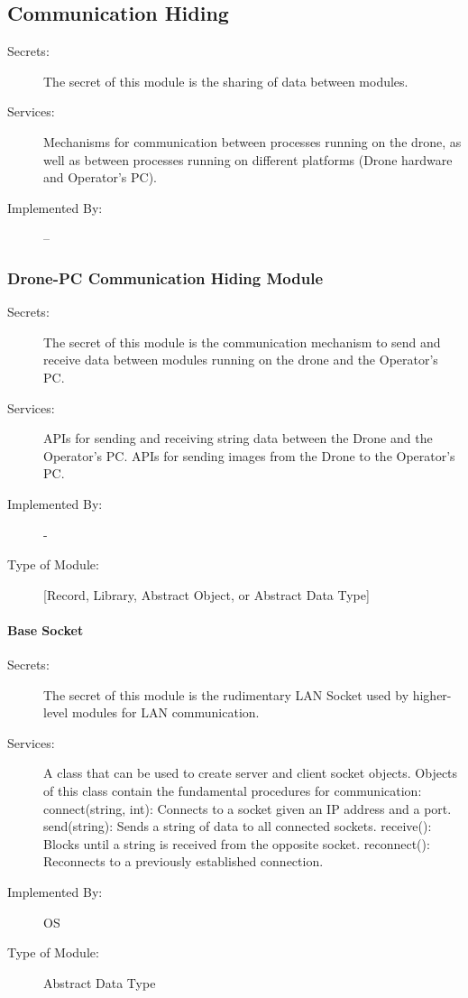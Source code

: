 \documentclass[12pt, titlepage]{article}
\begin{document}
\begin{description}
\end{description}




\subsection{Communication Hiding}
\begin{description}
\item[Secrets:] The secret of this module is the sharing of data between modules.
\item[Services:] Mechanisms for communication between processes running on the drone, as well as between processes running on different platforms (Drone hardware and Operator's PC). 
\item[Implemented By:] --
\end{description}

\subsubsection{Drone-PC Communication Hiding Module}
\begin{description}
\item[Secrets:] The secret of this module is the communication mechanism to send and receive data between  modules running on the drone and the Operator's PC.
\item[Services:] APIs for sending and receiving string data between the Drone and the Operator's PC. APIs for sending images from the Drone to the Operator's PC.
\item[Implemented By:] -
\item[Type of Module:] [Record, Library, Abstract Object, or Abstract Data Type]
\end{description}

\paragraph{Base Socket}
\label{Base Socket}
\begin{description}
\item[Secrets:] The secret of this module is the rudimentary LAN Socket used by higher-level modules for LAN communication. 
\item[Services:] A class that can be used to create server and client socket objects. Objects of this class contain the fundamental procedures for communication:  \\
connect(string, int): Connects to a socket given an IP address and a port. \\
send(string): Sends a string of data to all connected sockets.
receive(): Blocks until a string is received from the opposite socket.
reconnect(): Reconnects to a previously established connection. 
\item[Implemented By:] OS
\item[Type of Module:] Abstract Data Type
\end{description}
\end{document}
